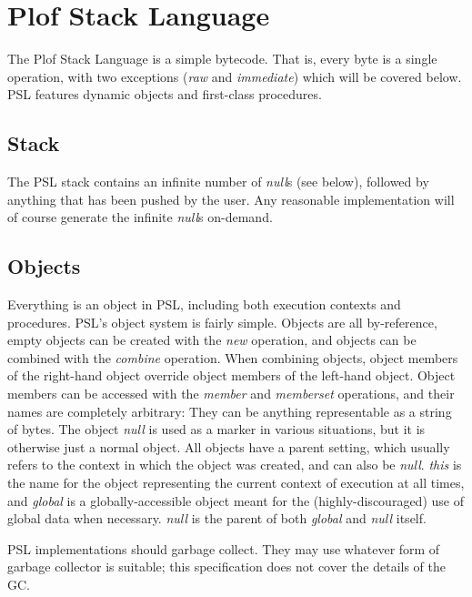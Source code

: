 \chapter{Plof Stack Language}

The Plof Stack Language is a simple bytecode. That is, every byte is a single operation, with two exceptions (\textit{raw} and \textit{immediate}) which will be covered below. PSL features dynamic objects and first-class procedures.



\section{Stack}

The PSL stack contains an infinite number of \textit{null}s (see below), followed by anything that has been pushed by the user. Any reasonable implementation will of course generate the infinite \textit{null}s on-demand.



\section{Objects}

Everything is an object in PSL, including both execution contexts and procedures. PSL's object system is fairly simple. Objects are all by-reference, empty objects can be created with the \textit{new} operation, and objects can be combined with the \textit{combine} operation. When combining objects, object members of the right-hand object override object members of the left-hand object. Object members can be accessed with the \textit{member} and \textit{memberset} operations, and their names are completely arbitrary: They can be anything representable as a string of bytes. The object \textit{null }is used as a marker in various situations, but it is otherwise just a normal object. All objects have a parent setting, which usually refers to the context in which the object was created, and can also be \textit{null}. \textit{this} is the name for the object representing the current context of execution at all times, and \textit{global} is a globally-accessible object meant for the (highly-discouraged) use of global data when necessary. \textit{null} is the parent of both \textit{global} and \textit{null} itself.

PSL implementations should garbage collect. They may use whatever form of garbage collector is suitable; this specification does not cover the details of the GC.



